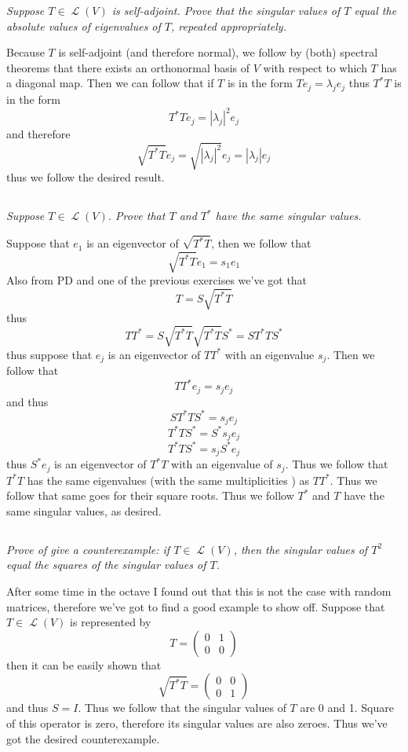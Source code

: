 \documentclass[11pt,oneside,titlepage]{book}
\DeclareMathOperator \map {\mathcal {L}}
\begin{document}
\textit{Suppose $T \in \map(V)$ is self-adjoint. Prove that the singular values of $T$
  equal the absolute values of eigenvalues of $T$, repeated appropriately.}

Because $T$ is self-adjoint (and therefore normal), we follow by (both) spectral theorems that
there exists an orthonormal basis of $V$ with respect to which $T$ has a diagonal map.
Then we can follow that if $T$ is in the form
$T e_j = \lambda_j e_j$
thus $T^*T$ is in the form
$$T^*T e_j = |\lambda_j|^2e_j$$
and therefore
$$\sqrt{T^*T} e_j = \sqrt{|\lambda_j|^2}e_j = |\lambda_j| e_j$$
thus we follow the desired result.

\subsection{}

\textit{Suppose $T \in \map(V)$. Prove that $T$ and $T^*$ have the same singular values.}

Suppose that $e_1$ is an eigenvector of  $\sqrt{T^* T}$, then we follow that
$$ \sqrt{T^* T} e_1 = s_1 e_1$$
Also from PD and one of the previous exercises we've got that
$$T = S \sqrt{T^* T}$$
thus
$$T T^* = S \sqrt{T^* T} \sqrt{T^* T} S^* = S T^* T S^*$$
thus suppose that $e_j$ is an eigenvector of $T T^*$ with an eigenvalue $s_j$. Then we follow that
$$T T^* e_j = s_j e_j$$
and thus
$$S T^* T S^* = s_j e_j$$
$$T^* T S^* = S^*s_j e_j$$
$$T^* T S^* = s_j S^* e_j$$
thus $S^* e_j$ is an eigenvector of $T^* T$ with an eigenvalue of $s_j$. Thus we follow that
$T^* T$ has the same eigenvalues (with the same multiplicities ) as $TT^*$. Thus we follow that
same goes for their square roots. Thus we follow $T^*$ and $T$ have the same singular values, as
desired.

\subsection{}

\textit{Prove of give a counterexample: if $T \in \map(V)$, then the singular values of $T^2$
  equal the squares of the singular values of $T$.}

After some time in the octave I found out that this is not the case with random matrices,
therefore we've got to find a good example to show off. Suppose that $T \in \map(V)$ is
represented by
$$T =
\begin{pmatrix}
  0 & 1\\
  0 & 0
\end{pmatrix}
$$
then it can be easily shown that
$$\sqrt{T^* T} =
\begin{pmatrix}
  0 & 0 \\
  0 & 1
\end{pmatrix}
$$
and thus $S = I$. Thus we follow that the singular values of $T$ are 0 and 1. Square of this
operator is zero, therefore its singular values are also zeroes. Thus we've got the
desired counterexample.
\end{document}

